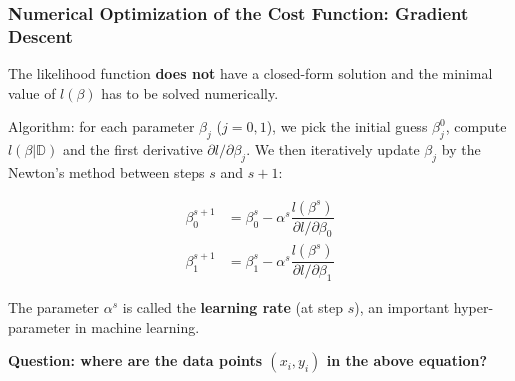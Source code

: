 \documentclass[10pt,aspectratio=169]{beamer}
\begin{document}
      \begin{frame}
        \frametitle{Numerical Optimization of the Cost Function:
          Gradient Descent}
        The likelihood function \textbf{does not} have a closed-form
        solution and the minimal value of $l(\beta)$ has to be solved
        numerically.

        \vfill Algorithm: for each parameter $\beta_{j}$ ($j=0, 1$),
        we pick the initial guess $\beta_{j}^{0}$, compute
        $l(\beta|\mathbb{D})$ and the first derivative
        $\partial l/\partial \beta_{j}$. We then iteratively update
        $\beta_{j}$ by the Newton's method between steps $s$ and
        $s+1$:

        \begin{align*}
          \beta_{0}^{s+1} &= \beta_{0}^{s} - \alpha^{s} \dfrac{l(\beta^{s})}{\partial l/\partial \beta_{0}} \\
          \beta_{1}^{s+1} &= \beta_{1}^{s} - \alpha^{s} \dfrac{l(\beta^{s})}{\partial l/\partial \beta_{1}}
        \end{align*}

        The parameter $\alpha^{s}$ is called the \textbf{learning
          rate} (at step $s$), an important hyper-parameter in machine
        learning.

        \vfill \textbf{Question: where are the data points
          $(x_{i}, y_{i})$ in the above equation?}

      \end{frame}
\end{document}
